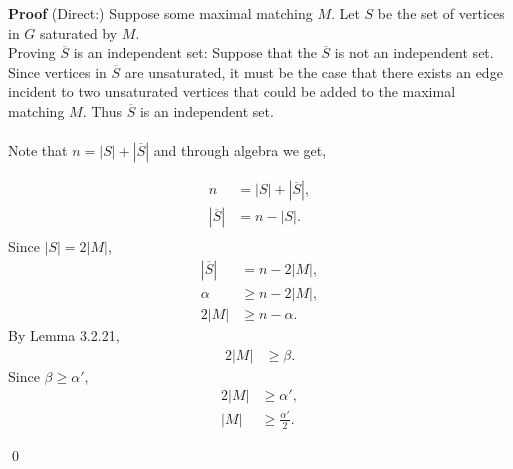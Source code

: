 \documentclass{amsart}
\begin{document}
\begin{enumerate}
\textbf{Proof} (Direct:) Suppose some maximal matching $M$. Let $S$ be the set of vertices in $G$ saturated by $M$.\\

Proving $\overline{S}$ is an independent set:
Suppose that the $\overline{S}$ is not an independent set. Since vertices in $\overline{S}$ are unsaturated, it must be the case that there exists an edge incident to two unsaturated vertices that could be added to the maximal matching $M$. Thus $\overline{S}$ is an independent set.\\           
\\
Note that $n = |S| + |\overline{S}|$ and through algebra we get,  

\begin{align*}
n &= |S| + |\overline{S}|,\\
|\overline{S}| &= n - |S|. \\
\end{align*}
Since $|S| = 2|M|$,
\begin{align*}
|\overline{S}| &= n - 2|M|, \\
\alpha &\geq n - 2|M|, \\
2|M| &\geq n - \alpha.
\end{align*}
By Lemma 3.2.21,
\begin{align*}
 2|M| &\geq \beta .
 \end{align*}
 Since $\beta \geq \alpha'$,
 \begin{align*}
  2|M| &\geq \alpha' ,\\
  |M| &\geq \frac{\alpha'}{2}. 
\end{align*}


\qed




 

\vspace{1.5in}

\end{enumerate}
\end{document}
